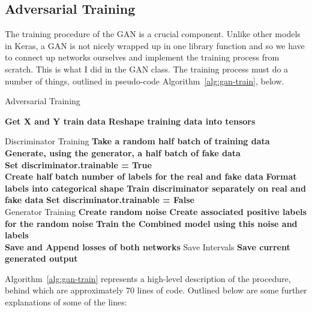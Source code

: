 \documentclass[12pt,a4paper,twoside]{report}
\begin{document}
\subsection{Adversarial Training}

The training procedure of the GAN is a crucial component. Unlike other models in Keras, a GAN is not nicely wrapped up in one library function and so we have to connect up networks ourselves and implement the training process from scratch. This is what I did in the GAN class. The training process must do a number of things, outlined in pseudo-code Algorithm~\ref{alg:gan-train}, below.

\begin{algorithm}[!htbp]
\caption{Adversarial Training }\label{alg:gan-train}
\begin{algorithmic}[1]
	
        \State \textbf{Get X and Y train data}
        \State \textbf{Reshape training data into tensors} 
        \State 
         
		\State
		\Comment Discriminator Training 
		\State \textbf{Take a random half batch of training data}
		\State \textbf{Generate, using the generator, a half batch of fake data}\\
		\State \textbf{Set discriminator.trainable = True}\\
		\State \textbf{Create half batch number of labels for the real and fake data}
		\State \textbf{Format labels into categorical shape}
		\State \textbf{Train discriminator separately on real and fake data}
		\State \textbf{Set discriminator.trainable = False}\\
		\State
		\Comment Generator Training 
		\State \textbf{Create random noise} 
		\State \textbf{Create associated positive labels for the random noise}
		\State \textbf{Train the Combined model using this noise and labels}\\
		\State \textbf{Save and Append losses of both networks }
		\State
		\Comment Save Intervals
			\State \textbf{Save current generated output}
		\EndIf
   	\EndFor
   
\EndProcedure
\end{algorithmic}
\end{algorithm}

Algorithm~\ref{alg:gan-train} represents a high-level description of the procedure, behind which are approximately 70 lines of code. Outlined below are some further explanations of some of the lines:
 
\end{document}
